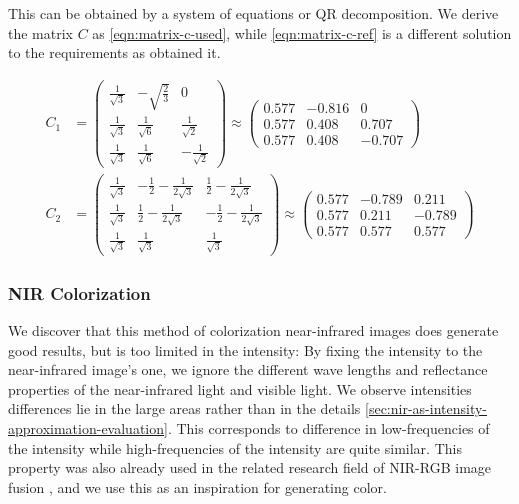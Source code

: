 This can be obtained by a system of equations or QR decomposition. 
We derive the matrix $C$ as \autoref{eqn:matrix-c-used}, while \autoref{eqn:matrix-c-ref} is a different solution to the requirements as \textcite{sbgm} obtained it.

\begin{align}
   C_1 & =
   \begin{pmatrix}
      \frac{1}{\sqrt{3}} & - \sqrt{\frac{2}{3}} & 0                   \\
      \frac{1}{\sqrt{3}} & \frac{1}{\sqrt{6}}   & \frac{1}{\sqrt{2}}  \\
      \frac{1}{\sqrt{3}} & \frac{1}{\sqrt{6}}   & -\frac{1}{\sqrt{2}}
   \end{pmatrix}
   \approx
   \begin{pmatrix}
      0.577 & -0.816 & 0      \\
      0.577 & 0.408  & 0.707  \\
      0.577 & 0.408  & -0.707
   \end{pmatrix}
   \label{eqn:matrix-c-ref} \\
   C_2 & =
   \begin{pmatrix}
      \frac{1}{\sqrt{3}} & -\frac{1}{2} - \frac{1}{2\sqrt{3}} & \frac{1}{2} - \frac{1}{2\sqrt{3}}  \\
      \frac{1}{\sqrt{3}} & \frac{1}{2} - \frac{1}{2\sqrt{3}}  & -\frac{1}{2} - \frac{1}{2\sqrt{3}} \\
      \frac{1}{\sqrt{3}} & \frac{1}{\sqrt{3}}                 & \frac{1}{\sqrt{3}}
   \end{pmatrix}
   \approx
   \begin{pmatrix}
      0.577 & -0.789 & 0.211  \\
      0.577 & 0.211  & -0.789 \\
      0.577 & 0.577  & 0.577
   \end{pmatrix}
   \label{eqn:matrix-c-used}
\end{align}

\subsubsection{NIR Colorization}
\label{sec:correction-guided-sampling-nir-colorization}

We discover that this method of colorization near-infrared images does generate good results, but is too limited in the intensity:
By fixing the intensity to the near-infrared image's one, we ignore the different wave lengths and reflectance properties of the near-infrared light and visible light.
We observe intensities differences lie in the large areas rather than in the details \autoref{sec:nir-as-intensity-approximation-evaluation}.
This corresponds to difference in low-frequencies of the intensity while high-frequencies of the intensity are quite similar.
This property was also already used in the related research field of NIR-RGB image fusion \parencite{study-vis-nir-fusion},
and we use this as an inspiration for generating color.

